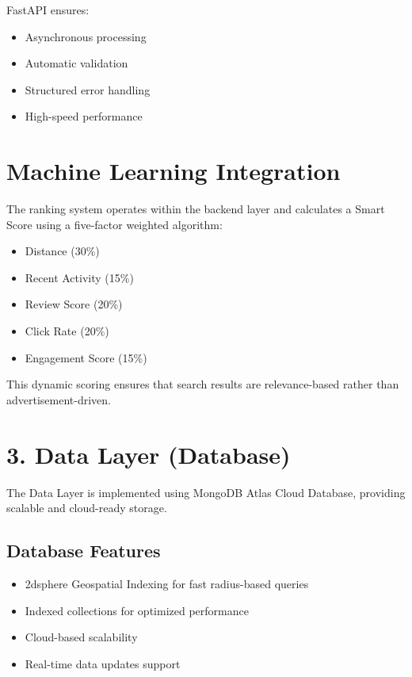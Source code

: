 \documentclass[12pt,a4paper]{report}
\begin{document}
FastAPI ensures:

\begin{itemize}

\item Asynchronous processing

\item Automatic validation

\item Structured error handling

\item High-speed performance

\end{itemize}

\section{Machine Learning Integration}

The ranking system operates within the backend layer and calculates a Smart Score using a five-factor weighted algorithm:

\begin{itemize}

\item Distance (30\%)

\item Recent Activity (15\%)

\item Review Score (20\%)

\item Click Rate (20\%)

\item Engagement Score (15\%)

\end{itemize}

This dynamic scoring ensures that search results are relevance-based rather than advertisement-driven.

\section{3. Data Layer (Database)}

The Data Layer is implemented using MongoDB Atlas Cloud Database, providing scalable and cloud-ready storage.

\subsection*{Database Features}

\begin{itemize}

\item 2dsphere Geospatial Indexing for fast radius-based queries

\item Indexed collections for optimized performance

\item Cloud-based scalability

\item Real-time data updates support

\end{itemize}
\end{document}
